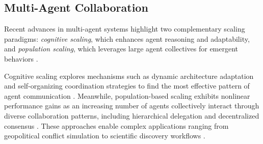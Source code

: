
\subsection{Multi-Agent Collaboration}


Recent advances in multi-agent systems highlight two complementary scaling paradigms: \textit{cognitive scaling}, which enhances agent reasoning and adaptability, and \textit{population scaling}, which leverages large agent collectives for emergent behaviors \citep{zhugegptswarm, qian2024scalinglargelanguagemodelbasedmultiagentcollaboration}. 

Cognitive scaling explores mechanisms such as dynamic architecture adaptation and self-organizing coordination strategies to find the most effective pattern of agent communication \citep{zhugegptswarm}. Meanwhile, population-based scaling exhibits nonlinear performance gains as an increasing number of agents collectively interact through diverse collaboration patterns, including hierarchical delegation and decentralized consensus \citep{qian2024scalinglargelanguagemodelbasedmultiagentcollaboration}. 
These approaches enable complex applications ranging from geopolitical conflict simulation \citep{hua2024warpeacewaragentlarge} to scientific discovery workflows \citep{zhou2024hypothesis, zhang2025crewfacilitatinghumanaiteaming}.

